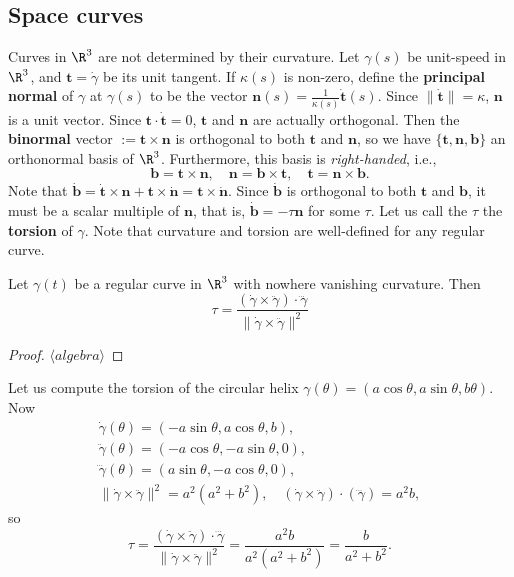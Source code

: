 \subsection{Space curves}
Curves in $\R^3$ are not determined by their curvature. Let $\gamma (s)$ be unit-speed in $\R^3$, and $\mathbf t=\dot\gamma $ be its unit tangent. If $\kappa(s)$ is non-zero, define the \textbf{principal normal} of $\gamma $ at $\gamma (s)$ to be the vector $\mathbf n(s)= \frac{1}{\kappa(s)}\dot{\mathbf t}(s)$. Since $\|\dot{\mathbf t}\|=\kappa$, $\mathbf n$ is a unit vector. Since $\mathbf t \cdot \dot{\mathbf t}=0$, $\mathbf t$ and $\mathbf n$ are actually orthogonal. Then the \textbf{binormal} vector $\mathbf := \mathbf t\times \mathbf n$ is orthogonal to both $\mathbf t$ and $\mathbf n$, so we have $\{\mathbf t,\mathbf n,\mathbf b\} $ an orthonormal basis of $\R^3$. Furthermore, this basis is \emph{right-handed}, i.e., \[
\mathbf b=\mathbf t \times \mathbf n, \quad \mathbf n=\mathbf b\times \mathbf t, \quad \mathbf t=\mathbf n\times \mathbf b.
\] Note that $\dot{\mathbf b}=\dot {\mathbf t}\times \mathbf n+\mathbf t\times \dot{\mathbf n}=\mathbf t \times \dot{\mathbf n}$. Since $\dot{\mathbf b}$ is orthogonal to both $\mathbf t$ and $\mathbf b$, it must be a scalar multiple of $\mathbf n$, that is, $\dot{\mathbf b}=-\tau \mathbf n$ for some $\tau$. Let us call the $\tau$ the \textbf{torsion} of $\gamma $. Note that curvature and torsion are well-defined for any regular curve.
\begin{prop}
    Let $\gamma (t)$ be a regular curve in $\R^3$ with nowhere vanishing curvature. Then \[
        \tau=\frac{(\dot\gamma \times \ddot\gamma )\cdot \dddot \gamma }{\|\dot\gamma \times \ddot\gamma \|^2}
    \] 
\end{prop}
\begin{proof}
    $\langle algebra \rangle $
\end{proof}
\begin{example}
    Let us compute the torsion of the circular helix $\gamma (\theta)=(a \cos\theta, a \sin\theta, b\theta)$. Now 
    \begin{gather*}
    \dot \gamma (\theta)=(-a \sin \theta, a \cos \theta, b),    \\
\ddot\gamma (\theta)=(-a \cos \theta, -a \sin \theta, 0),\\
    \dddot\gamma (\theta) =(a \sin \theta, -a \cos \theta,0),\\
    \|\dot\gamma \times \ddot\gamma \|^2=a^2(a^2+b^2),\quad (\dot \gamma \times \ddot\gamma )\cdot (\dddot \gamma )=a^2b,
    \end{gather*}so \[
    \tau= \frac{(\dot \gamma \times \ddot\gamma )\cdot \dddot \gamma }{\|\dot\gamma \times \ddot\gamma \|^2}= \frac{a^2 b}{a^2(a^2+b^2)}=\frac{b}{a^2+b^2}.
    \] 
\end{example}

